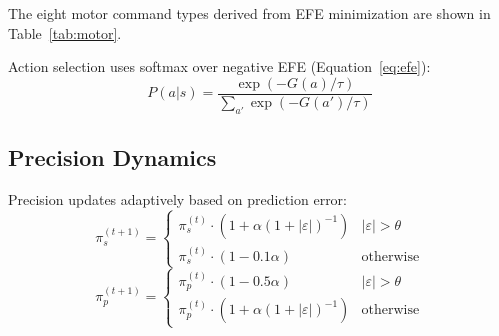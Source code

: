 \documentclass[10pt,letterpaper]{article}
\begin{document}
The eight motor command types derived from EFE minimization are shown in Table~\ref{tab:motor}.

\begin{table}[ht]
\centering
\caption{Motor command types from EFE minimization.}
\label{tab:motor}
\small
{}
\end{table}

Action selection uses softmax over negative EFE (Equation~\ref{eq:efe}):
\begin{equation}
P(a|s) = \frac{\exp(-G(a)/\tau)}{\sum_{a'}\exp(-G(a')/\tau)}
\end{equation}

\subsection{Precision Dynamics}

Precision updates adaptively based on prediction error:
\begin{equation}
\pi_s^{(t+1)} = \begin{cases}
\pi_s^{(t)} \cdot (1 + \alpha(1+|\varepsilon|)^{-1}) & |\varepsilon| > \theta \\
\pi_s^{(t)} \cdot (1 - 0.1\alpha) & \text{otherwise}
\end{cases}
\end{equation}
\begin{equation}
\pi_p^{(t+1)} = \begin{cases}
\pi_p^{(t)} \cdot (1 - 0.5\alpha) & |\varepsilon| > \theta \\
\pi_p^{(t)} \cdot (1 + \alpha(1+|\varepsilon|)^{-1}) & \text{otherwise}
\end{cases}
\end{equation}
\end{document}

